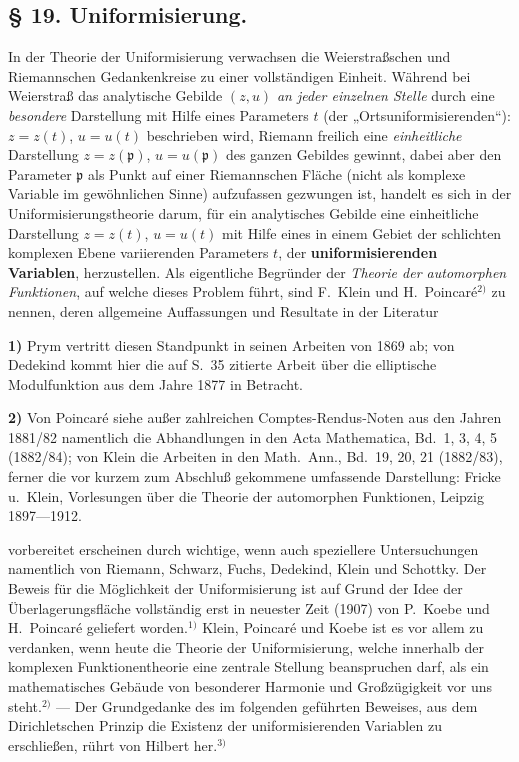 \documentclass{article}
\begin{document}
\subsection*{§ 19. Uniformisierung.}

In der Theorie der Uniformisierung verwachsen die Weierstraßschen und Riemannschen Gedankenkreise zu einer vollständigen Einheit. Während bei Weierstraß das analytische Gebilde $(z, u)$ \emph{an jeder einzelnen Stelle} durch eine \emph{besondere} Darstellung mit Hilfe eines Parameters $t$ (der „Ortsuniformisierenden“): $z = z(t)$, $u = u(t)$ beschrieben wird, Riemann freilich eine \emph{einheitliche} Darstellung $z = z(\mathfrak{p})$, $u = u(\mathfrak{p})$ des ganzen Gebildes gewinnt, dabei aber den Parameter $\mathfrak{p}$ als Punkt auf einer Riemannschen Fläche (nicht als komplexe Variable im gewöhnlichen Sinne) aufzufassen gezwungen ist, handelt es sich in der Uniformisierungstheorie darum, für ein analytisches Gebilde eine einheitliche Darstellung $z = z(t)$, $u = u(t)$ mit Hilfe eines in einem Gebiet der schlichten komplexen Ebene variierenden Parameters $t$, der \textbf{uniformisierenden Variablen}, herzustellen. Als eigentliche Begründer der \emph{Theorie der automorphen Funktionen}, auf welche dieses Problem führt, sind F.~Klein und H.~Poincaré${}^{2)}$ zu nennen, deren allgemeine Auffassungen und Resultate in der Literatur

\textbf{1)} Prym vertritt diesen Standpunkt in seinen Arbeiten von 1869 ab; von Dedekind kommt hier die auf S.~35 zitierte Arbeit über die elliptische Modulfunktion aus dem Jahre 1877 in Betracht.

\textbf{2)} Von Poincaré siehe außer zahlreichen Comptes-Rendus-Noten aus den Jahren 1881/82 namentlich die Abhandlungen in den Acta Mathematica, Bd.~1, 3, 4, 5 (1882/84); von Klein die Arbeiten in den Math.\ Ann., Bd.~19, 20, 21 (1882/83), ferner die vor kurzem zum Abschluß gekommene umfassende Darstellung: Fricke u.\ Klein, Vorlesungen über die Theorie der automorphen Funktionen, Leipzig 1897---1912.

vorbereitet erscheinen durch wichtige, wenn auch speziellere Untersuchungen namentlich von Riemann, Schwarz, Fuchs, Dedekind, Klein und Schottky. Der Beweis für die Möglichkeit der Uniformisierung ist auf Grund der Idee der Überlagerungsfläche vollständig erst in neuester Zeit (1907) von P.~Koebe und H.~Poincaré geliefert worden.${}^{1)}$ Klein, Poincaré und Koebe ist es vor allem zu verdanken, wenn heute die Theorie der Uniformisierung, welche innerhalb der komplexen Funktionentheorie eine zentrale Stellung beanspruchen darf, als ein mathematisches Gebäude von besonderer Harmonie und Großzügigkeit vor uns steht.${}^{2)}$ --- Der Grundgedanke des im folgenden geführten Beweises, aus dem Dirichletschen Prinzip die Existenz der uniformisierenden Variablen zu erschließen, rührt von Hilbert her.${}^{3)}$
\end{document}
